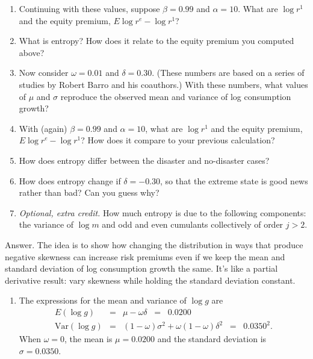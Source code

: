 \documentclass[11pt]{article}
\begin{document}
\begin{enumerate}
\begin{enumerate}
\item Continuing with these values, suppose $\beta = 0.99$ and $\alpha = 10$.
What are $\log r^1$ and
the equity premium,  $E \log r^e - \log r^1 $?

\item What is entropy?
How does it relate to the equity premium you computed above?

\item Now consider $\omega = 0.01$ and $\delta = 0.30$.
(These numbers are based on a series of studies by Robert Barro and his coauthors.)
With these numbers, what values of $\mu$ and $\sigma$ reproduce
the observed mean and variance of log consumption growth?

\item With (again) $\beta = 0.99$ and $\alpha = 10$,
what are $\log r^1$ and
the equity premium,  $E \log r^e - \log r^1 $?
How does it compare to your previous calculation?

\item How does entropy differ between the
disaster and no-disaster cases?

\item How does entropy change if $\delta = - 0.30$,
so that the extreme state is good news rather than bad?
Can you guess why?

\item {\it Optional, extra credit.\/}
How much entropy is due to the following components:
the variance of $\log m$ and odd and even cumulants collectively
of order $j>2$.
\end{enumerate}

Answer.
The idea is to show how changing the distribution
in ways that produce negative skewness can increase risk
premiums even if we keep the mean and standard deviation of log consumption
growth the same.
It's like a partial derivative result:
vary skewness while holding the standard deviation constant.

\begin{enumerate}
\item The expressions for the mean and variance of $\log g$ are
\begin{eqnarray*}
    E (\log g)   &=&  \mu - \omega \delta \;\;=\;\; 0.0200 \\
    \mbox{Var}(\log g) &=& (1-\omega) \sigma^2 + \omega (1-\omega) \delta^2
                \;\;=\;\; 0.0350^2 .
\end{eqnarray*}
When $\omega = 0$, the mean is $\mu = 0.0200$ and the standard
deviation is $\sigma = 0.0350$.


\end{enumerate}
\end{enumerate}
\end{document}
